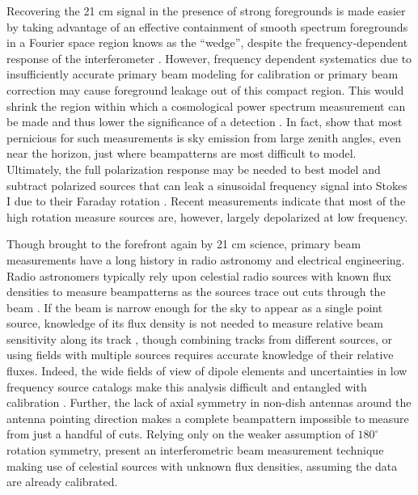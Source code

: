 Recovering the 21 cm signal in the presence of strong foregrounds is made easier by taking advantage of an effective containment of smooth spectrum foregrounds in a Fourier space region knows as the ``wedge'', despite the frequency-dependent response of the interferometer \citep{Dattapowerspec,X13, pober13,MoralesPSShapes, VedanthamWedge, nithya13, CathWedge, AdrianWedge1, AdrianWedge2}. However, frequency dependent systematics due to insufficiently accurate primary beam modeling for calibration or primary beam correction may cause foreground leakage out of this compact region. This would shrink the region within which a cosmological power spectrum measurement can be made and thus lower the significance of a detection \citep{PoberNextGen}. In fact, \citet{nithya15,nithya15b} show that most pernicious for such measurements is sky emission from large zenith angles, even near the horizon, just where beampatterns are most difficult to model. Ultimately, the full polarization response may be needed to best model and subtract polarized sources that can leak a sinusoidal frequency signal into Stokes I due to their Faraday rotation \citep{jelic2010,moore13}. Recent measurements \citep{bernardi13, moore13,moore15,asad15} indicate that most of the high rotation measure sources are, however, largely depolarized at low frequency.%

Though brought to the forefront again by 21 cm science, primary beam measurements have a long history in radio astronomy and electrical engineering. Radio astronomers typically rely upon celestial radio sources with known flux densities to measure beampatterns as the sources trace out cuts through the beam \citep[e.g.,][]{nithyaVLA}. If the beam is narrow enough for the sky to appear as a single point source, knowledge of its flux density is not needed to measure relative beam sensitivity along its track \citep[e.g.][]{colegate14}, though combining tracks from different sources, or using fields with multiple sources requires accurate knowledge of their relative fluxes. Indeed, the wide fields of view of dipole elements and uncertainties in low frequency source catalogs make this analysis difficult and entangled with calibration \citep{jacobs2013}. Further, the lack of axial symmetry in non-dish antennas around the antenna pointing direction makes a complete beampattern impossible to measure from just a handful of cuts. Relying only on the weaker assumption of $180^\circ$ rotation symmetry, \citet{pober12} present an interferometric beam measurement technique making use of celestial sources with unknown flux densities, assuming the data are already calibrated.  

